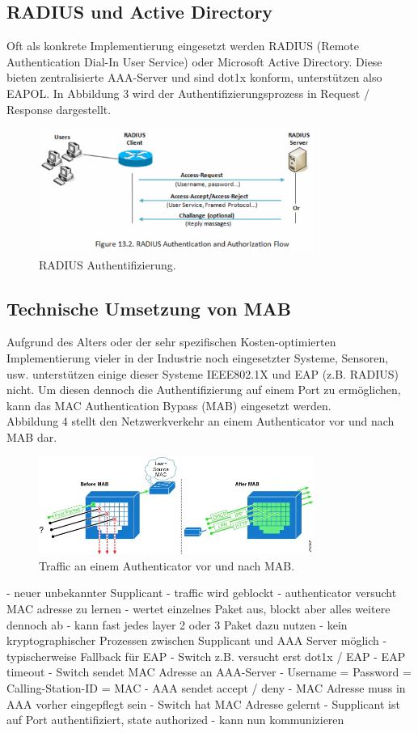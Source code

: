 \documentclass[conference]{IEEEtran}
\begin{document}
\subsection{RADIUS und Active Directory}
Oft als konkrete Implementierung eingesetzt werden RADIUS (Remote Authentication Dial-In User Service) oder Microsoft Active Directory. Diese bieten zentralisierte AAA-Server und sind dot1x konform, unterstützen also EAPOL. In Abbildung 3 wird der Authentifizierungsprozess in Request / Response dargestellt.

\begin{figure}[hbt]
	\centering
	\includegraphics[width=9cm]{figures/Radius}
	\caption{RADIUS Authentifizierung.}
\end{figure}

\subsection{Technische Umsetzung von MAB}
Aufgrund des Alters oder der sehr spezifischen Kosten-optimierten Implementierung vieler in der Industrie noch eingesetzter Systeme, Sensoren, usw. unterstützen einige dieser Systeme IEEE802.1X und EAP (z.B. RADIUS) nicht. Um diesen dennoch die Authentifizierung auf einem Port zu ermöglichen, kann das MAC Authentication Bypass (MAB) eingesetzt werden.\\
Abbildung 4 stellt den Netzwerkverkehr an einem Authenticator vor und nach MAB dar.

\begin{figure}[hbt]
	\centering
	\includegraphics[width=9cm]{figures/mab-before-after}
	\caption{Traffic an einem Authenticator vor und nach MAB.}
\end{figure}

- neuer unbekannter Supplicant
- traffic wird geblockt
- authenticator versucht MAC adresse zu lernen
- wertet einzelnes Paket aus, blockt aber alles weitere dennoch ab
- kann fast jedes layer 2 oder 3 Paket dazu nutzen
- kein kryptographischer Prozessen zwischen Supplicant und AAA Server möglich
- typischerweise Fallback für EAP
- Switch z.B. versucht erst dot1x / EAP
- EAP timeout
- Switch sendet MAC Adresse an AAA-Server
- Username = Password = Calling-Station-ID = MAC
- AAA sendet accept / deny
- MAC Adresse muss in AAA vorher eingepflegt sein
- Switch hat MAC Adresse gelernt
- Supplicant ist auf Port authentifiziert, state authorized
- kann nun kommunizieren
\end{document}
